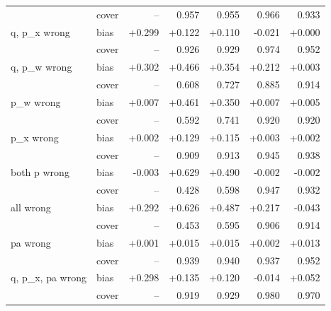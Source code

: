 \begin{tabular}{@{}llrrrrr@{}}
 & cover & -- & 0.957 & 0.955 & 0.966 & 0.933\\
q, p_x wrong & bias & +0.299 & +0.122 & +0.110 & -0.021 & +0.000\\
 & cover & -- & 0.926 & 0.929 & 0.974 & 0.952\\
q, p_w wrong & bias & +0.302 & +0.466 & +0.354 & +0.212 & +0.003\\
 & cover & -- & 0.608 & 0.727 & 0.885 & 0.914\\
p_w wrong & bias & +0.007 & +0.461 & +0.350 & +0.007 & +0.005\\
 & cover & -- & 0.592 & 0.741 & 0.920 & 0.920\\
p_x wrong & bias & +0.002 & +0.129 & +0.115 & +0.003 & +0.002\\
 & cover & -- & 0.909 & 0.913 & 0.945 & 0.938\\
both p wrong & bias & -0.003 & +0.629 & +0.490 & -0.002 & -0.002\\
 & cover & -- & 0.428 & 0.598 & 0.947 & 0.932\\
all wrong & bias & +0.292 & +0.626 & +0.487 & +0.217 & -0.043\\
 & cover & -- & 0.453 & 0.595 & 0.906 & 0.914\\
pa wrong & bias & +0.001 & +0.015 & +0.015 & +0.002 & +0.013\\
 & cover & -- & 0.939 & 0.940 & 0.937 & 0.952\\
q, p_x, pa wrong & bias & +0.298 & +0.135 & +0.120 & -0.014 & +0.052\\
 & cover & -- & 0.919 & 0.929 & 0.980 & 0.970\\
\bottomrule
\end{tabular}